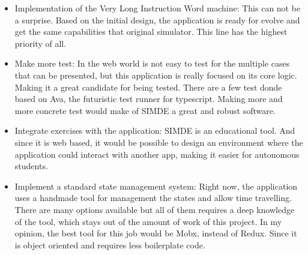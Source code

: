 \begin{itemize}

\item Implementation of the Very Long Instruction Word machine: This can not be a surprise. Based on the
 initial design, the application is ready for evolve and get the same capabilities that original simulator.
 This line has the highest priority of all.

\item Make more test: In the web world is not easy to test for the multiple cases that can be presented,
but this application is really focused on its core logic. Making it a great candidate for being tested. 
There are a few test donde based on Ava, the futuristic test runner for typescript. Making more and 
more concrete test would make of SIMDE a great and robust software.

\item Integrate exercises with the application: SIMDE is an educational tool. And since it is web based, 
it would be possible to design an environment where the application could interact with another app, 
making it easier for autonomous students.

\item Implement a standard state management system: Right now, the application uses a handmade tool for
management the states and allow time travelling. There are many options available but all of them requires
a deep knowledge of the tool, which stays out of the amount of work of this project. In my opinion, the best 
tool for this job would be Mobx, instead of Redux. Since it is object oriented and requires less boilerplate code.

\end{itemize}